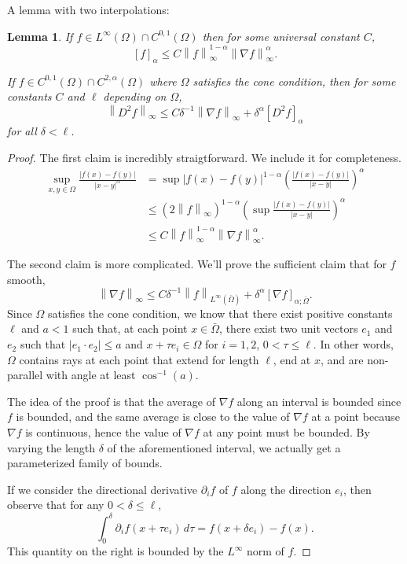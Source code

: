 \documentclass[11pt]{amsart}
\newtheorem{lemma}[theorem]{Lemma}
\theoremstyle{remark}
\theoremstyle{definition}
\newcommand{\norm}[1]{\left\lVert#1\right\rVert}
\newcommand{\paren}[1]{\left( #1 \right)}
\newcommand{\bracket}[1]{\left[ #1 \right]}
\newcommand{\del}{\partial}
\newcommand{\grad}{\nabla}
\newcommand{\n}{^{-1}}
\begin{document}
A lemma with two interpolations:
\begin{lemma} \label{thm:Holder interpolation}
If $f \in L^\infty(\Omega) \cap C^{0,1}(\Omega)$ then for some universal constant $C$,
\[ \bracket{f}_\alpha \leq C \norm{f}_\infty^{1-\alpha} \norm{\grad f}_\infty^\alpha. \]

If $f \in C^{0,1}(\Omega) \cap C^{2,\alpha}(\Omega)$ where $\Omega$ satisfies the cone condition, then for some constants $C$ and $\ell$ depending on $\Omega$,
\[ \norm{D^2 f}_\infty \leq C \delta\n \norm{\grad f}_\infty  + \delta^\alpha \bracket{D^2 f}_\alpha\]
for all $\delta < \ell$.  
\end{lemma}
\begin{proof}
The first claim is incredibly straigtforward.  We include it for completeness.  
\begin{align*} 
\sup_{x,y \in \Omega} \frac{|f(x)-f(y)|}{|x-y|^\alpha} &= \sup |f(x)-f(y)|^{1-\alpha} \paren{\frac{|f(x)-f(y)|}{|x-y|}}^\alpha 
\\ &\leq \paren{2 \norm{f}_\infty}^{1-\alpha} \paren{ \sup \frac{|f(x)-f(y)|}{|x-y|} }^\alpha
\\ &\leq C \norm{f}_\infty^{1-\alpha} \norm{\grad f}_\infty^\alpha.
\end{align*}

The second claim is more complicated.  We'll prove the sufficient claim that for $f$ smooth,
\[ \norm{\grad f}_\infty \leq C \delta\n \norm{f}_{L^\infty(\bar{\Omega})} + \delta^\alpha \bracket{\grad f}_{\alpha;\bar{\Omega}}.\]
Since $\Omega$ satisfies the cone condition, we know that there exist positive constants $\ell$ and $a<1$ such that, at each point $x \in \bar{\Omega}$, there exist two unit vectors $e_1$ and $e_2$ such that $|e_1\cdot e_2| \leq a$ and $x + \tau e_i \in \Omega$ for $i=1,2$, $0 < \tau \leq \ell$.  In other words, $\Omega$ contains rays at each point that extend for length $\ell$, end at $x$, and are non-parallel with angle at least $\cos\n(a)$.  

The idea of the proof is that the average of $\grad f$ along an interval is bounded since $f$ is bounded, and the same average is close to the value of $\grad f$ at a point because $\grad f$ is continuous, hence the value of $\grad f$ at any point must be bounded.  By varying the length $\delta$ of the aforementioned interval, we actually get a parameterized family of bounds.  

If we consider the directional derivative $\del_i f$ of $f$ along the direction $e_i$, then observe that for any $0 < \delta \leq \ell$,
\[ \int_0^\delta \del_i f(x + \tau e_i) \,d\tau = f(x+\delta e_i) - f(x). \]
This quantity on the right is bounded by the $L^\infty$ norm of $f$.  


\end{proof}
\end{document}
